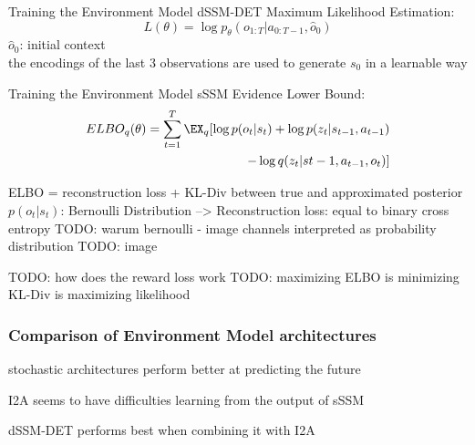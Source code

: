 \begin{frame}{Training the Environment Model}
    dSSM-DET
    Maximum Likelihood Estimation:
    \begin{equation}
            L(\theta) = \log p_{\theta}(o_{1:T}|a_{0:T-1}, \hat{o}_0)
        \end{equation}
        $\hat{o}_0$: initial context\\
        the encodings of the last 3 observations are used to generate $s_0$ in a learnable way
    
\end{frame}

\begin{frame}{Training the Environment Model}
    sSSM
        Evidence Lower Bound:
        \begin{equation}
        \begin{aligned}
            ELBO_q(\theta) = \sum_{t=1}^T \EX_q[\log p(o_t|s_t) + \log p(z_t|s_{t-1}, a_{t-1})\\ - \log q(z_t|s{t-1}, a_{t-1}, o_t)]
        \end{aligned}
        \end{equation}
        
        ELBO = reconstruction loss + KL-Div between true and approximated posterior\\
        $p(o_t|s_t)$: Bernoulli Distribution
        --> Reconstruction loss: equal to binary cross entropy
        TODO: warum bernoulli - image channels interpreted as probability distribution
        TODO: image
        
        TODO: how does the reward loss work
        TODO: maximizing ELBO is minimizing KL-Div is maximizing likelihood
\end{frame}

\begin{frame}

\end{frame}


\begin{frame}
	\frametitle{Comparison of Environment Model architectures}
	\begin{PraesentationAufzaehlung}
		\item stochastic architectures perform better at predicting the future\\
		\item I2A seems to have difficulties learning from the output of sSSM
		\item dSSM-DET performs best when combining it with I2A
	\end{PraesentationAufzaehlung}
\end{frame}




